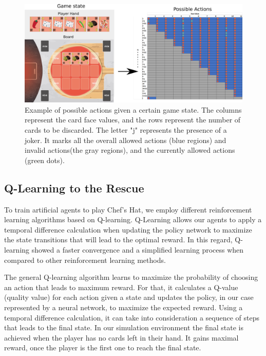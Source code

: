 \documentclass[a4paper,conference]{IEEEtran}
\begin{document}
\begin{figure}
    \centering
    \includegraphics[width=1\columnwidth]{possibleActions.png}
    \caption{Example of possible actions given a certain game state. The columns represent the card face values, and the rows represent the number of cards to be discarded. The letter "j" represents the presence of a joker. It marks all the overall allowed actions (blue regions) and invalid actions(the gray regions), and the currently allowed actions (green dots).}
    \label{fig:possibleActions}
\end{figure}


\subsection{Q-Learning to the Rescue}

To train artificial agents to play Chef's Hat, we employ different reinforcement learning algorithms based on Q-learning. Q-Learning allows our agents to apply a temporal difference calculation when updating the policy network to maximize the state transitions that will lead to the optimal reward. In this regard, Q-learning showed a faster convergence and a simplified learning process \cite{shoham2003multi, gosavi2009reinforcement, kiumarsi2017optimal} when compared to other reinforcement learning methods. 

The general Q-learning algorithm learns to maximize the probability of choosing an action that leads to maximum reward. For that, it calculates a Q-value (quality value) for each action given a state and updates the policy, in our case represented by a neural network, to maximize the expected reward. Using a temporal difference calculation, it can take into consideration a sequence of steps that leads to the final state. In our simulation environment the final state is achieved when the player has no cards left in their hand. It gains maximal reward, once the player is the first one to reach the final state.
\end{document}
